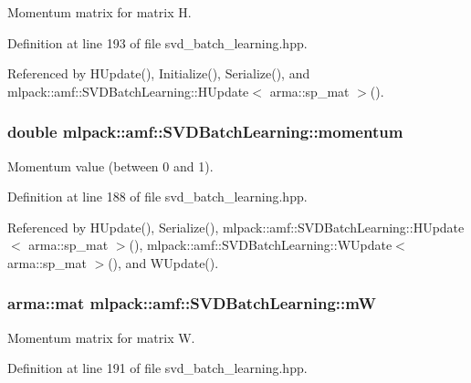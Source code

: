 Momentum matrix for matrix H. 



Definition at line 193 of file svd\+\_\+batch\+\_\+learning.\+hpp.



Referenced by H\+Update(), Initialize(), Serialize(), and mlpack\+::amf\+::\+S\+V\+D\+Batch\+Learning\+::\+H\+Update$<$ arma\+::sp\+\_\+mat $>$().

\subsubsection[{momentum}]{\setlength{\rightskip}{0pt plus 5cm}double mlpack\+::amf\+::\+S\+V\+D\+Batch\+Learning\+::momentum\hspace{0.3cm}{\ttfamily [private]}}\label{classmlpack_1_1amf_1_1SVDBatchLearning_a634ccfb27e600ffc433223dcea8763a1}


Momentum value (between 0 and 1). 



Definition at line 188 of file svd\+\_\+batch\+\_\+learning.\+hpp.



Referenced by H\+Update(), Serialize(), mlpack\+::amf\+::\+S\+V\+D\+Batch\+Learning\+::\+H\+Update$<$ arma\+::sp\+\_\+mat $>$(), mlpack\+::amf\+::\+S\+V\+D\+Batch\+Learning\+::\+W\+Update$<$ arma\+::sp\+\_\+mat $>$(), and W\+Update().

\subsubsection[{mW}]{\setlength{\rightskip}{0pt plus 5cm}arma\+::mat mlpack\+::amf\+::\+S\+V\+D\+Batch\+Learning\+::mW\hspace{0.3cm}{\ttfamily [private]}}\label{classmlpack_1_1amf_1_1SVDBatchLearning_ab3e822a4685a26878119a457386e981e}


Momentum matrix for matrix W. 



Definition at line 191 of file svd\+\_\+batch\+\_\+learning.\+hpp.



